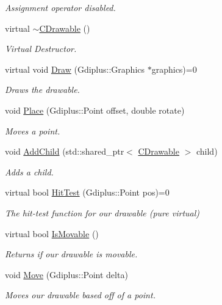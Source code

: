 \begin{DoxyCompactItemize}
\begin{DoxyCompactList}\small\item\em Assignment operator disabled. \end{DoxyCompactList}\item 
virtual \hyperlink{class_c_drawable_a58fd1036856d627b19976088e4143630}{$\sim$\+C\+Drawable} ()
\begin{DoxyCompactList}\small\item\em Virtual Destructor. \end{DoxyCompactList}\item 
virtual void \hyperlink{class_c_drawable_a9b6a9920a75d88d9ae321997495eaec7}{Draw} (Gdiplus\+::\+Graphics $\ast$graphics)=0
\begin{DoxyCompactList}\small\item\em Draws the drawable. \end{DoxyCompactList}\item 
void \hyperlink{class_c_drawable_ac154be14313b739471d3a1529a2b31b5}{Place} (Gdiplus\+::\+Point offset, double rotate)
\begin{DoxyCompactList}\small\item\em Moves a point. \end{DoxyCompactList}\item 
void \hyperlink{class_c_drawable_ab636167462699dde9b80e6dcb08caf7c}{Add\+Child} (std\+::shared\+\_\+ptr$<$ \hyperlink{class_c_drawable}{C\+Drawable} $>$ child)
\begin{DoxyCompactList}\small\item\em Adds a child. \end{DoxyCompactList}\item 
virtual bool \hyperlink{class_c_drawable_af715bc2e79788b2a44a74ad70b181544}{Hit\+Test} (Gdiplus\+::\+Point pos)=0
\begin{DoxyCompactList}\small\item\em The hit-\/test function for our drawable (pure virtual) \end{DoxyCompactList}\item 
virtual bool \hyperlink{class_c_drawable_ac9f03cfc58aed75fb52cd69c71e7b6e0}{Is\+Movable} ()
\begin{DoxyCompactList}\small\item\em Returns if our drawable is movable. \end{DoxyCompactList}\item 
void \hyperlink{class_c_drawable_a2241b02a5f50c7a455283a9fb24d5b27}{Move} (Gdiplus\+::\+Point delta)
\begin{DoxyCompactList}\small\item\em Moves our drawable based off of a point. \end{DoxyCompactList}\item 

\end{DoxyCompactItemize}
